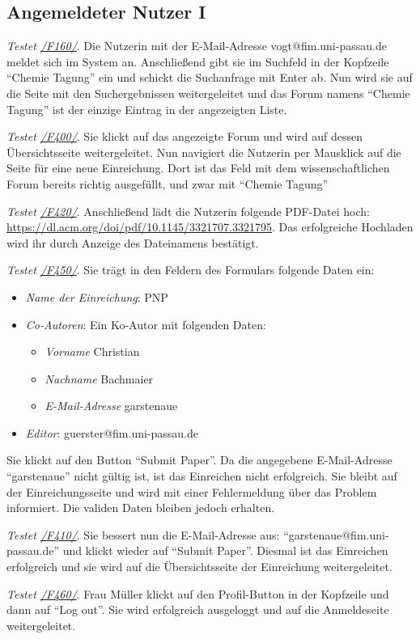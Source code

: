 \subsection{Angemeldeter Nutzer I}
\begin{description}

	 \emph{Testet \hyperref[funkt:160]{/F160/}}.
	Die Nutzerin mit der E-Mail-Adresse vogt@fim.uni-passau.de meldet sich im System an.
	Anschließend gibt sie im Suchfeld in der Kopfzeile ``Chemie Tagung'' ein und schickt die Suchanfrage mit Enter ab.
	Nun wird sie auf die Seite mit den Suchergebnissen weitergeleitet und das Forum namens ``Chemie Tagung'' ist der einzige Eintrag in der angezeigten Liste.

	 \emph{Testet \hyperref[funkt:400]{/F400/}}.
	Sie klickt auf das angezeigte Forum und wird auf dessen Übersichtsseite weitergeleitet.
	Nun navigiert die Nutzerin per Mausklick auf die Seite für eine neue Einreichung.
	Dort ist das Feld mit dem wissenschaftlichen Forum bereits richtig ausgefüllt, und zwar mit ``Chemie Tagung''

	 \emph{Testet \hyperref[funkt:420]{/F420/}}.
	Anschließend lädt die Nutzerin folgende PDF-Datei hoch: \href{https://dl.acm.org/doi/pdf/10.1145/3321707.3321795}{https://dl.acm.org/doi/pdf/10.1145/3321707.3321795}.
	Das erfolgreiche Hochladen wird ihr durch Anzeige des Dateinamens bestätigt.

	 \emph{Testet \hyperref[funkt:450]{/F450/}}.
	Sie trägt in den Feldern des Formulars folgende Daten ein:
	\begin{itemize}
		\item \emph{Name der Einreichung}: P\neq NP
		\item \emph{Co-Autoren}: Ein Ko-Autor mit folgenden Daten:
		\begin{itemize}
			\item \emph{Vorname} Christian
			\item \emph{Nachname} Bachmaier
			\item \emph{E-Mail-Adresse} garstenaue
		\end{itemize}
		\item \emph{Editor}: guerster@fim.uni-passau.de
	\end{itemize}
	Sie klickt auf den Button ``Submit Paper''.
	Da die angegebene E-Mail-Adresse ``garstenaue'' nicht gültig ist, ist das Einreichen nicht erfolgreich.
	Sie bleibt auf der Einreichungsseite und wird mit einer Fehlermeldung über das Problem informiert.
	Die validen Daten bleiben jedoch erhalten.

	 \emph{Testet \hyperref[funkt:410]{/F410/}}.
	Sie bessert nun die E-Mail-Adresse aus: ``garstenaue@fim.uni-passau.de'' und klickt wieder auf ``Submit Paper''.
	Diesmal ist das Einreichen erfolgreich und sie wird auf die Übersichtsseite der Einreichung weitergeleitet.

	 \emph{Testet \hyperref[funkt:460]{/F460/}}.
	Frau Müller klickt auf den Profil-Button in der Kopfzeile und dann auf ``Log out''.
	Sie wird erfolgreich ausgeloggt und auf die Anmeldeseite weitergeleitet.
\end{description}

